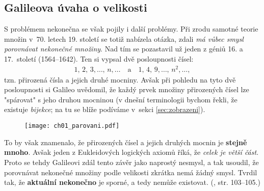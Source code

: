 \subsection{Galileova úvaha o velikosti}\label{subsec:galileo}
S problémem nekonečna se však pojily i další problémy. Při zrodu samotné teorie množin v~70. letech 19. století se totiž nabízela otázka, zdali \emph{má vůbec smysl porovnávat nekonečné množiny}. Nad tím se pozastavil už jeden z géniů 16. a 17.~století  (1564--1642). Ten si vypsal dvě posloupnosti čísel:
\begin{align*}
1,\,2,\,3,\dots,\,n,\dots \quad \text{a} \quad 1,\,4,\,9,\dots,\,n^2,\dots ,
\end{align*}
tzn. přirozená čísla a jejich druhé mocniny. Avšak při pohledu na tyto dvě posloupnosti si Galileo uvědomil, že každý prvek množiny přirozených čísel lze "spárovat" s jeho druhou mocninou (v dnešní terminologii bychom řekli, že existuje \emph{bijekce}; na tu se blíže podíváme v~sekci \ref{sec:zobrazeni}).
\begin{figure}[H]
	\centering
	\texttt{[image: ch01\_parovani.pdf]}
\end{figure}
To by však znamenalo, že přirozených čísel a jejich druhých mocnin je \textbf{stejně mnoho}. Avšak jeden z Eukleidových logických axiomů říká, že \emph{celek je větší část}. Proto se tehdy Galileovi zdál tento závěr jako naprostý nesmysl, a tak usoudil, že porovnávat nekonečné množiny podle velikosti zkrátka nemá žádný smysl. Tvrdil tak, že \textbf{aktuální nekonečno} je sporné, a tedy nemůže existovat. (\cite{Fuchs2003}, str. 103--105.)

